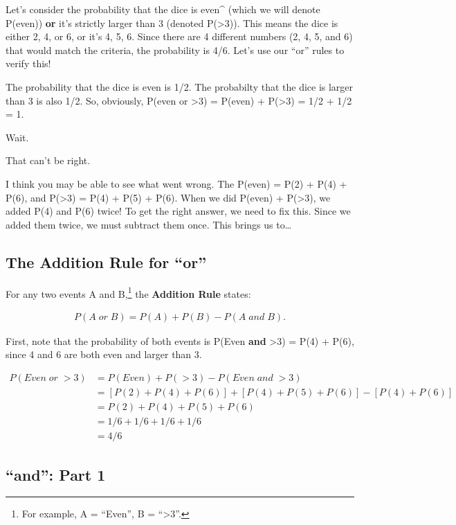 \documentclass[
  letterpaper,
  DIV=11,
  numbers=noendperiod,
  oneside]{scrreprt}
\begin{document}
Let's consider the probability that the dice is even\^{} (which we will
denote P(even)) \textbf{or} it's strictly larger than 3 (denoted
P(\textgreater3)). This means the dice is either 2, 4, or 6, or it's 4,
5, 6. Since there are 4 different numbers (2, 4, 5, and 6) that would
match the criteria, the probability is 4/6. Let's use our ``or'' rules
to verify this!

The probability that the dice is even is 1/2. The probabilty that the
dice is larger than 3 is also 1/2. So, obviously, P(even or
\textgreater3) = P(even) + P(\textgreater3) = 1/2 + 1/2 = 1.

Wait.

That can't be right.

I think you may be able to see what went wrong. The P(even) = P(2) +
P(4) + P(6), and P(\textgreater3) = P(4) + P(5) + P(6). When we did
P(even) + P(\textgreater3), we added P(4) and P(6) twice! To get the
right answer, we need to fix this. Since we added them twice, we must
subtract them once. This brings us to\ldots{}

\hypertarget{the-addition-rule-for-or}{%
\subsection{The Addition Rule for
``or''}\label{the-addition-rule-for-or}}

For any two events A and B,\footnote{For example, A = ``Even'', B =
  ``\textgreater3''.} the \textbf{Addition Rule} states:

\begin{align}P(A\; or\; B) = P(A) + P(B) - P(A\; and\; B).\end{align}

First, note that the probability of both events is P(Even \textbf{and}
\textgreater3) = P(4) + P(6), since 4 and 6 are both even and larger
than 3.

\begin{align*}
 P(Even\; or\; >3) & = P(Even) + P(>3) - P(Even\; and\; >3)\\
& = [P(2) + P(4) + P(6)] + [P(4) + P(5) + P(6)] - [P(4) + P(6)]\\
& =  P(2) + P(4) + P(5) + P(6)\\
& = 1/6 + 1/6 + 1/6 + 1/6\\
& = 4/6
\end{align*} \normalsize

\hypertarget{and-part-1}{%
\subsection{``and'': Part 1}\label{and-part-1}}
\end{document}
